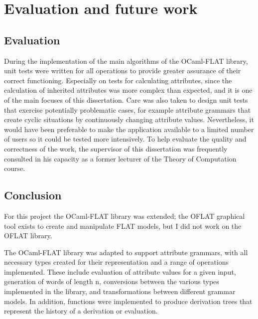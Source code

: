 
%

\chapter{Evaluation and future work}
\label{cha:Evaluation}


\section{Evaluation}
\label{sec:evaluation}

During the implementation of the main algorithms of the OCaml-FLAT library, unit tests were written for all operations to provide greater assurance of 
their correct functioning. Especially on tests for calculating attributes, since 
the calculation of inherited attributes was more complex than expected, and it is one of the main focuses of this dissertation. 
Care was also taken to design unit tests that exercise potentially problematic cases, for example attribute grammars that create cyclic situations by 
continuously changing attribute values. Nevertheless, it would have been preferable to make the application available to a limited number of users so it 
could be tested more intensively. To help evaluate the quality and correctness of the work, the supervisor of this dissertation was frequently consulted 
in his capacity as a former lecturer of the Theory of Computation course.

\section{Conclusion}
\label{sec:conclusion}

For this project the OCaml-FLAT library was extended; the OFLAT graphical tool exists to create and manipulate FLAT models, but I did not work on 
the OFLAT library.

The OCaml-FLAT library was adapted to support attribute grammars, with all necessary types created for their representation and a range of operations 
implemented. These include evaluation of attribute values for a given input, generation of words of length n, conversions between the various types 
implemented in the library, and transformations between different grammar models. In addition, functions were implemented to produce derivation trees 
that represent the history of a derivation or evaluation.


